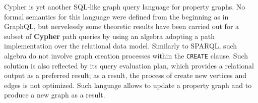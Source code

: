 
Cypher \cite{Neo4jMan,Robinson,CypherCheat} is yet another SQL-like graph query language for property graphs. No formal semantics for this
language were defined from the beginning as in GraphQL, but nervelessly some theoretic results have been carried out
for a subset of \textbf{Cypher} path queries \cite{Neo4jAlg} by using an algebra adopting a path implementation
over the relational data model. Similarly to SPARQL, such algebra do not involve graph creation processes within the \texttt{CREATE} clause. Such solution is also reflected by its query evaluation plan, which provides a relational output as a preferred result; as a result, the process of create new vertices and edges is not optimized.
Such language allows to update a property graph and to produce a new graph
as a result.


